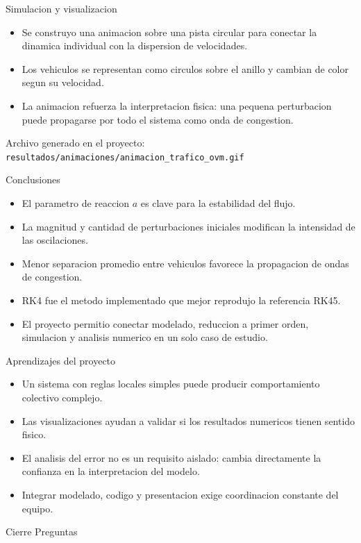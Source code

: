 \documentclass[aspectratio=169]{beamer}
\begin{document}
\begin{frame}{Simulacion y visualizacion}
  \begin{itemize}
    \item Se construyo una animacion sobre una pista circular para conectar la dinamica individual con la dispersion de velocidades.
    \item Los vehiculos se representan como circulos sobre el anillo y cambian de color segun su velocidad.
    \item La animacion refuerza la interpretacion fisica: una pequena perturbacion puede propagarse por todo el sistema como onda de congestion.
  \end{itemize}

  \vspace{0.3cm}
  \small
  Archivo generado en el proyecto: \texttt{resultados/animaciones/animacion\_trafico\_ovm.gif}
\end{frame}

\begin{frame}{Conclusiones}
  \begin{itemize}
    \item El parametro de reaccion $a$ es clave para la estabilidad del flujo.
    \item La magnitud y cantidad de perturbaciones iniciales modifican la intensidad de las oscilaciones.
    \item Menor separacion promedio entre vehiculos favorece la propagacion de ondas de congestion.
    \item RK4 fue el metodo implementado que mejor reprodujo la referencia RK45.
    \item El proyecto permitio conectar modelado, reduccion a primer orden, simulacion y analisis numerico en un solo caso de estudio.
  \end{itemize}
\end{frame}

\begin{frame}{Aprendizajes del proyecto}
  \begin{itemize}
    \item Un sistema con reglas locales simples puede producir comportamiento colectivo complejo.
    \item Las visualizaciones ayudan a validar si los resultados numericos tienen sentido fisico.
    \item El analisis del error no es un requisito aislado: cambia directamente la confianza en la interpretacion del modelo.
    \item Integrar modelado, codigo y presentacion exige coordinacion constante del equipo.
  \end{itemize}
\end{frame}

\begin{frame}{Cierre}
  \centering
  \Large Preguntas
\end{frame}
\end{document}
